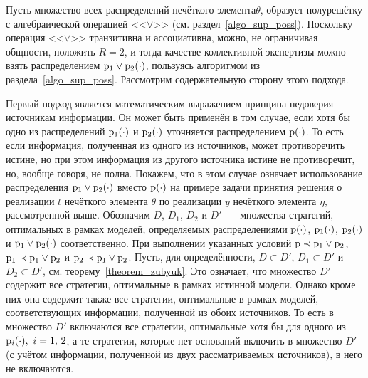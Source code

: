 \begin{notive}
Пусть множество всех распределений нечёткого элемента$\theta$, образует полурешётку с алгебраической операцией <<$\vee$>> (см. раздел~\ref{algo_sup_poss}). Поскольку операция <<$\vee$>> транзитивна и ассоциативна, можно, не ограничивая общности, положить $R = 2$, и тогда качестве коллективной экспертизы можно взять распределением ${\mathrm{p}}_1 \vee{\mathrm{p}}_2(\cdot)$, пользуясь алгоритмом из раздела~\ref{algo_sup_poss}. Рассмотрим содержательную сторону этого подхода.



Первый подход является математическим выражением принципа недоверия источникам информации. Он может быть применён в том случае, если хотя бы одно из распределений ${\mathrm{p}}_1(\cdot)$ и ${\mathrm{p}}_2(\cdot)$ уточняется распределением ${\mathrm{p}}(\cdot)$. То есть если информация, полученная из одного из источников, может противоречить истине, но при этом информация из другого источника истине не противоречит, но, вообще говоря, не полна. Покажем, что в этом случае означает использование распределения ${\mathrm{p}}_1\vee{\mathrm{p}}_2(\cdot)$ вместо ${\mathrm{p}}(\cdot)$ на примере задачи принятия решения о реализации $t$ нечёткого элемента $\theta$ по реализации $y$ нечёткого элемента $\eta$, рассмотренной выше. Обозначим $D$, $D_1$, $D_2$ и $D'$~--- множества стратегий, оптимальных в рамках моделей, определяемых распределениями ${\mathrm{p}}(\cdot)$, ${\mathrm{p}}_1(\cdot)$, ${\mathrm{p}}_2(\cdot)$ и ${\mathrm{p}}_1\vee{\mathrm{p}}_2(\cdot)$ соответственно. При выполнении указанных условий ${\mathrm{p}}\prec{\mathrm{p}}_1\vee{\mathrm{p}}_2$, ${\mathrm{p}}_1\prec{\mathrm{p}}_1\vee{\mathrm{p}}_2$ и ${\mathrm{p}}_2\prec{\mathrm{p}}_1\vee{\mathrm{p}}_2$. Пусть, для определённости, $D\subset D'$, $D_1\subset D'$ и $D_2\subset D'$, см. теорему~\ref{theorem_zubyuk}. Это означает, что множество $D'$ содержит все стратегии, оптимальные в рамках истинной модели. Однако кроме них она содержит также все стратегии, оптимальные в рамках моделей, соответствующих информации, полученной из обоих источников. То есть в множество $D'$ включаются все стратегии, оптимальные хотя бы для одного из ${\mathrm{p}}_i(\cdot),\ i=1,\, 2$, а те стратегии, которые нет оснований включить в множество $D'$ (с учётом информации, полученной из двух рассматриваемых источников), в него не включаются.


\end{notive}

